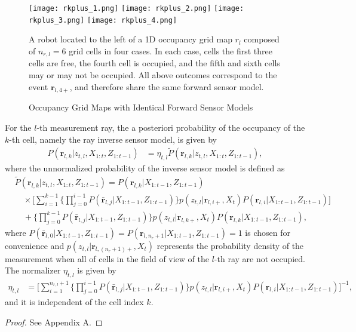\begin{figure}
  \centering
  \texttt{[image: rkplus\_1.png]}
    \centering
  \texttt{[image: rkplus\_2.png]}  
  \centering
  \texttt{[image: rkplus\_3.png]}
    \centering
  \texttt{[image: rkplus\_4.png]}
  \caption{Occupancy Grid Maps with Identical Forward Sensor Models}
  \medskip
  \small
  A robot located to the left of a 1D occupancy grid map $r_l$ composed of $n_{r,l}=6$ grid cells in four cases. In each case, cells the first three cells are free, the fourth cell is occupied, and the fifth and sixth cells may or may not be occupied. All above outcomes correspond to the event $\mathbf{r}_{l,4+}$, and therefore share the same forward sensor model.
  \label{fig:show_rkplus}
\end{figure}

\begin{prop}
\label{prop:ISM}
For the $l$-th measurement ray, the a posteriori probability of the occupancy of the $k$-th cell, namely the ray inverse sensor model, is given by
\begin{align}
\label{eqn:RayISMAnswer}
P(\mathbf{r}_{l,k}|z_{t,l},X_{1:t},Z_{1:t-1})&=\eta_{t,l}\tilde P(\mathbf{r}_{l,k}|z_{t,l},X_{1:t},Z_{1:t-1}),
\end{align}
where the unnormalized probability of the inverse sensor model is defined as
\begin{align}
\label{eqn:Unnormalized}
& \tilde P(\mathbf{r}_{l,k}|z_{t,l},X_{1:t},Z_{1:t-1})%
=P(\mathbf{r}_{l,k}|X_{1:t-1},Z_{1:t-1})\nonumber\\
&\quad\times 
\bigg[\sum_{i=1}^{k-1}\bigg\{\prod_{j=0}^{i-1}P(\bar{\mathbf{r}}_{l,j}|X_{1:t-1},Z_{1:t-1})\bigg\}%
p(z_{t,l}|\mathbf{r}_{l,i+},X_t)P(\mathbf{r}_{l,i}|X_{1:t-1},Z_{1:t-1})\bigg]\nonumber\\
&\quad + \bigg\{\prod_{j=0}^{k-1}P(\bar{\mathbf{r}}_{l,j}|X_{1:t-1},Z_{1:t-1})\bigg\}%
p(z_{t,l}|\mathbf{r}_{l,k+},X_t)P(\mathbf{r}_{l,k}|X_{1:t-1},Z_{1:t-1}),
\end{align}
where $P(\bar{\mathbf{r}}_{l,0}|X_{1:t-1},Z_{1:t-1})=P(\mathbf{r}_{l,n_r+1}|X_{1:t-1},Z_{1:t-1})=1$ is chosen for convenience and $p(z_{t,l}|\mathbf{r}_{l,(n_r+1)+},X_t)$ represents the probability density of the measurement when all of cells in the field of view of the $l$-th ray are not occupied. The normalizer $\eta_{t,l}$ is given by
\begin{align}
\label{eqn:allEta}
\eta_{t,l}
&=
\bigg[\sum_{i=1}^{n_{r,l}+1}\bigg\{\prod_{j=0}^{i-1}P(\bar{\mathbf{r}}_{l,j}|X_{1:t-1},Z_{1:t-1})\bigg\}p(z_{t,l}|\mathbf{r}_{l,i+},X_t)P(\mathbf{r}_{l,i}|X_{1:t-1},Z_{1:t-1})\bigg]^{-1},
\end{align}
and it is independent of the cell index $k$.
\end{prop}
\begin{proof}%
See Appendix A.
\end{proof}

